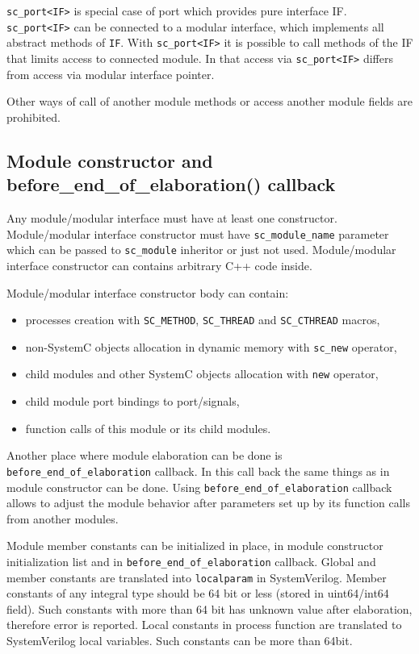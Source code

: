 {\tt sc\_port<IF>} is special case of port which provides pure interface IF. {\tt sc\_port<IF>} can be connected to a modular interface, which implements all abstract methods of {\tt IF}. With {\tt sc\_port<IF>} it is possible to call methods of the IF that limits access to connected module. In that access via {\tt sc\_port<IF>} differs from access via modular interface pointer.

Other ways of call of another module methods or access another module fields are prohibited. 


\subsection{Module constructor and before\_end\_of\_elaboration() callback}

Any module/modular interface must have at least one constructor. Module/modular interface constructor must have {\tt sc\_module\_name} parameter which can be passed to {\tt sc\_module} inheritor or just not used. Module/modular interface constructor can contains arbitrary C++ code inside. 

Module/modular interface constructor body can contain:
\begin{itemize}
\item processes creation with {\tt SC\_METHOD}, {\tt SC\_THREAD} and {\tt SC\_CTHREAD} macros,
\item non-SystemC objects allocation in dynamic memory with {\tt sc\_new} operator,
\item child modules and other SystemC objects allocation with {\tt new} operator,
\item child module port bindings to port/signals,
\item function calls of this module or its child modules.
\end{itemize}

Another place where module elaboration can be done is {\tt before\_end\_of\_elaboration} callback. In this call back the same things as in module constructor can be done. Using {\tt before\_end\_of\_elaboration} callback allows to adjust the module behavior after parameters set up by its function calls from another modules.

Module member constants can be initialized in place, in module constructor initialization list and in {\tt before\_end\_of\_elaboration} callback. Global and member constants are translated into {\tt localparam} in SystemVerilog. 
Member constants of any integral type should be 64 bit or less (stored in uint64/int64 field). Such constants with more than 64 bit has unknown value after 
elaboration, therefore error is reported.
Local constants in process function are translated to SystemVerilog local variables. Such constants can be more than 64bit.

